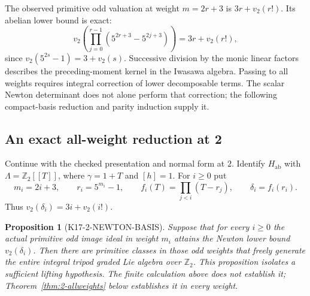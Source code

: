 \documentclass[11pt,a4paper]{article}
\newtheorem{proposition}[theorem]{Proposition}
\theoremstyle{definition}
\begin{document}
The observed primitive odd valuation at weight $m=2r+3$ is
$3r+v_2(r!)$. Its abelian lower bound is exact:
\[
 v_2\!\left(\prod_{j=0}^{r-1}
 (5^{2r+3}-5^{2j+3})\right)=3r+v_2(r!),
\]
since $v_2(5^{2s}-1)=3+v_2(s)$. Successive division by the
monic linear factors describes the preceding-moment kernel
in the Iwasawa algebra. Passing to all weights requires integral
correction of lower decomposable terms. The scalar Newton determinant
does not alone perform that correction; the following compact-basis
reduction and parity induction supply it.

\subsection{An exact all-weight reduction at 2}

Continue with the checked presentation and normal form at $2$.
Identify $H_{\mathrm{ab}}$ with
$\Lambda=\mathbb Z_2[[T]]$, where $\gamma=1+T$ and $[h]=1$.
For $i\geq0$ put
\[
 m_i=2i+3,\qquad r_i=5^{m_i}-1,\qquad
 f_i(T)=\prod_{j<i}(T-r_j),\qquad \delta_i=f_i(r_i).
\]
Thus $v_2(\delta_i)=3i+v_2(i!)$.

\begin{proposition}[K17-2-NEWTON-BASIS]\label{prop:newton-basis}
Suppose that for every $i\geq0$ the actual primitive odd
image ideal in weight $m_i$ attains the Newton lower bound
$v_2(\delta_i)$. Then there are primitive classes in those odd
weights that freely generate the entire integral tripod graded
Lie algebra over $\mathbb Z_2$.
This proposition isolates a sufficient lifting hypothesis. The finite
calculation above does not establish it; Theorem~\ref{thm:2-allweights}
below establishes it in every weight.
\end{proposition}
\end{document}
